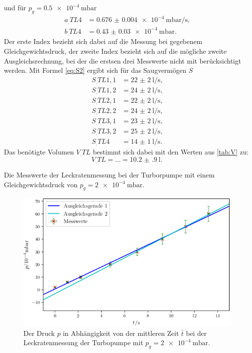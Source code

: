 und für $p_g = \SI{0.5e-4}{\milli\bar}$
\begin{align*}
a_.{TL4} &= \SI{0.676(4)e-4}{\milli\bar\per\second} \text{,}\\
b_.{TL4} &= \SI{0.43(3)e-4}{\milli\bar} \text{.}
\end{align*}
Der erste Index bezieht sich dabei auf die Messung bei gegebenem Gleichgewichtsdruck, der zweite Index bezieht sich auf die mögliche zweite Ausgleichsrechnung, bei der die erstsen drei Messwerte nicht mit berücksichtigt werden.
Mit Formel \eqref{eq:S2} ergibt sich für das Saugvermögen $S$
\begin{align*}
S_.{TL1,1} &= \SI{22(2)}{\litre\per\second} \text{,}\\
S_.{TL1,2} &= \SI{24(2)}{\litre\per\second} \text{,}\\
S_.{TL2,1} &= \SI{22(2)}{\litre\per\second} \text{,}\\
S_.{TL2,2} &= \SI{24(2)}{\litre\per\second} \text{,}\\
S_.{TL3,1} &= \SI{23(2)}{\litre\per\second} \text{,}\\
S_.{TL3,2} &= \SI{25(2)}{\litre\per\second} \text{,}\\
S_.{TL4}   &= \SI{14(1)}{\litre\per\second} \text{.}
\end{align*}
Das benötigte Volumen $V_.{TL}$ bestimmt sich dabei mit den Werten aus \ref{tab:V} zu:
\[
V_.{TL} = \dots = \SI{10.2(9)}{\litre}\text{.}
\]

\begin{table}
\centering
\caption{Die Messwerte der Leckratenmessung bei der Turborpumpe mit einem Gleichgewichtsdruck von $p_g = \SI{2e-4}{\milli\bar}$.}

\label{tab:TL1}
\end{table}

\begin{figure}
\centering
\includegraphics[width=\linewidth-70pt,height=\textheight-70pt,keepaspectratio]{content/images/TL1.png}
\caption{Der Druck $p$ in Abhängigkeit von der mittleren Zeit $\bar{t}$ bei der Leckratenmessung der Turbopumpe  mit $p_g = \SI{2e-4}{\milli\bar}$.}
\label{fig:TL1}
\end{figure}

